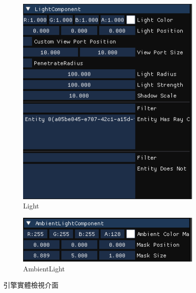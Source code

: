 \begin{figure}[h]
    \begin{subfigure}[b]{0.24\linewidth}
        \begin{center}
        \includegraphics[width=\linewidth]{./resources/editor/ins_light.png}
        \caption{Light}
        \end{center}
    \end{subfigure}
    \begin{subfigure}[b]{0.24\linewidth}
        \begin{center}
        \includegraphics[width=\linewidth]{./resources/editor/ins_ambient.png}
        \caption{AmbientLight}
        \end{center}
    \end{subfigure}
\caption{引擎實體檢視介面}
\label{fig:Inspector}
\end{figure}

